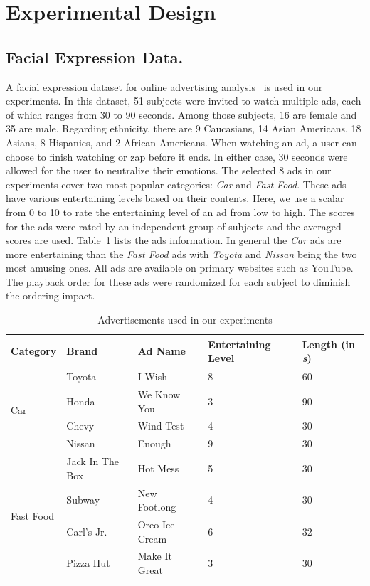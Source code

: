 \documentclass[twoside,leqno,twocolumn]{article}
\begin{document}
\section{Experimental Design}

\subsection{Facial Expression Data.}

A facial expression dataset for online advertising analysis~\cite{Yang_FG15} is used in our experiments. In this dataset, 51 subjects were invited to watch multiple ads, each of which ranges from 30 to 90 seconds. Among those subjects, 16 are female and 35 are male. Regarding ethnicity, there are 9 Caucasians, 14 Asian Americans, 18 Asians, 8 Hispanics, and 2 African Americans. When watching an ad, a user can choose to finish watching or zap before it ends. In either case, 30 seconds were allowed for the user to neutralize their emotions. The selected 8 ads in our experiments cover two most popular categories: \textit{Car} and \textit{Fast Food}. These ads have various entertaining levels based on their contents. Here, we use a scalar from 0 to 10 to rate the entertaining level of an ad from low to high. The scores for the ads were rated by an independent group of subjects and the averaged scores are used. Table~\ref{table:ads} lists the ads information. In general the \textit{Car} ads are more entertaining than the \textit{Fast Food} ads with \textit{Toyota} and \textit{Nissan} being the two most amusing ones. All ads are available on primary websites such as YouTube. The playback order for these ads were randomized for each subject to diminish the ordering impact. 


\begin{table}[!t]
\caption{Advertisements used in our experiments} \label{table:ads}
\centering
\scriptsize
\begin{tabular}{lllll}
\toprule
Category & Brand & Ad Name & Entertaining Level & Length (in \textit{s}) \\ \midrule

\multirow{4}{*}{Car}        & Toyota & I Wish  & 8 & 60			\\ %
                            & Honda  & We Know You  & 3 & 90 \\ %
                            & Chevy  & Wind Test  & 4 & 30  \\ %
                            & Nissan & Enough   & 9 & 30    \\ %
\midrule 
\multirow{4}{*}{Fast Food} & Jack In The Box & Hot Mess               & 5 &  30 \\ %
                            & Subway                & New Footlong    & 4 & 30 \\ %
                            & Carl's Jr.            & Oreo Ice Cream  & 6 &  32 \\ %
                            & Pizza Hut             & Make It Great   & 3 & 30 \\ %
\bottomrule
\end{tabular}
\end{table} 
\end{document}
